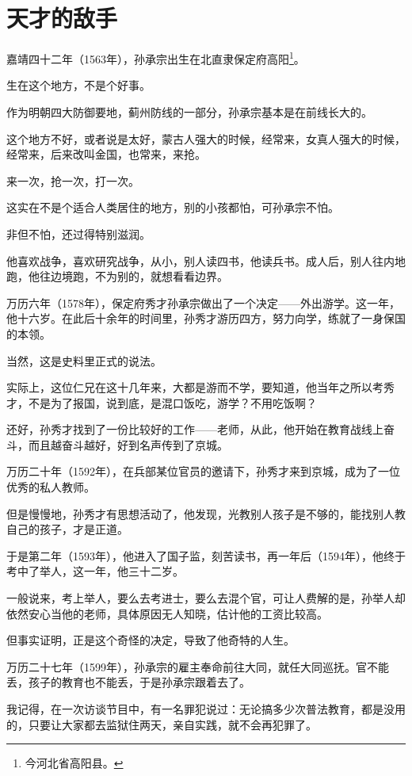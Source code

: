 \section{天才的敌手}
\ifnum{}
	\begin{multicols}{\theparacolNo}
\fi
嘉靖四十二年（1563年），孙承宗出生在北直隶保定府高阳\footnote{今河北省高阳县。}。

生在这个地方，不是个好事。

作为明朝四大防御要地，蓟州防线的一部分，孙承宗基本是在前线长大的。

这个地方不好，或者说是太好，蒙古人强大的时候，经常来，女真人强大的时候，经常来，后来改叫金国，也常来，来抢。

来一次，抢一次，打一次。

这实在不是个适合人类居住的地方，别的小孩都怕，可孙承宗不怕。

非但不怕，还过得特别滋润。

他喜欢战争，喜欢研究战争，从小，别人读四书，他读兵书。成人后，别人往内地跑，他往边境跑，不为别的，就想看看边界。

万历六年（1578年），保定府秀才孙承宗做出了一个决定——外出游学。这一年，他十六岁。在此后十余年的时间里，孙秀才游历四方，努力向学，练就了一身保国的本领。

当然，这是史料里正式的说法。

实际上，这位仁兄在这十几年来，大都是游而不学，要知道，他当年之所以考秀才，不是为了报国，说到底，是混口饭吃，游学？不用吃饭啊？

还好，孙秀才找到了一份比较好的工作——老师，从此，他开始在教育战线上奋斗，而且越奋斗越好，好到名声传到了京城。

万历二十年（1592年），在兵部某位官员的邀请下，孙秀才来到京城，成为了一位优秀的私人教师。

但是慢慢地，孙秀才有思想活动了，他发现，光教别人孩子是不够的，能找别人教自己的孩子，才是正道。

于是第二年（1593年），他进入了国子监，刻苦读书，再一年后（1594年），他终于考中了举人，这一年，他三十二岁。

一般说来，考上举人，要么去考进士，要么去混个官，可让人费解的是，孙举人却依然安心当他的老师，具体原因无人知晓，估计他的工资比较高。

但事实证明，正是这个奇怪的决定，导致了他奇特的人生。

万历二十七年（1599年），孙承宗的雇主奉命前往大同，就任大同巡抚。官不能丢，孩子的教育也不能丢，于是孙承宗跟着去了。

我记得，在一次访谈节目中，有一名罪犯说过：无论搞多少次普法教育，都是没用的，只要让大家都去监狱住两天，亲自实践，就不会再犯罪了。


\end{multicols}
